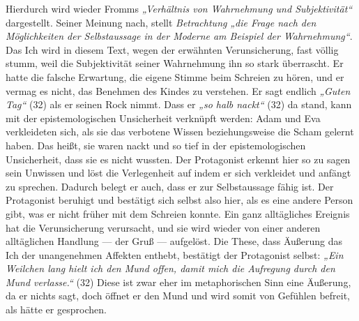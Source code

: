 \documentclass[12pt,a4paper]{article}
\begin{document}
Hierdurch wird wieder Fromms \textit{„Verhältnis von Wahrnehmung und Subjektivität“} dargestellt. Seiner Meinung nach, stellt \textit{Betrachtung} \textit{„die Frage nach den Möglichkeiten der Selbstaussage in der Moderne am Beispiel der Wahrnehmung“}.\autocite[104]{fromm} Das Ich wird in diesem Text, wegen der erwähnten Verunsicherung, fast völlig stumm, weil die Subjektivität seiner Wahrnehmung ihn so stark überrascht. Er hatte die falsche Erwartung, die eigene Stimme beim Schreien zu hören, und er vermag es nicht, das Benehmen des Kindes zu verstehen. Er sagt endlich \textit{„Guten Tag“} (32) als er seinen Rock nimmt. Dass er \textit{„so halb nackt“} (32) da stand, kann mit der epistemologischen Unsicherheit verknüpft werden: Adam und Eva verkleideten sich, als sie das verbotene Wissen beziehungsweise die Scham gelernt haben. Das heißt, sie waren nackt und so tief in der epistemologischen Unsicherheit, dass sie es nicht wussten. Der Protagonist erkennt hier so zu sagen sein Unwissen und löst die Verlegenheit auf indem er sich verkleidet und anfängt zu sprechen. Dadurch belegt er auch, dass er zur Selbstaussage fähig ist. Der Protagonist beruhigt und bestätigt sich selbst also hier, als es eine andere Person gibt, was er nicht früher mit dem Schreien konnte. Ein ganz alltägliches Ereignis hat die Verunsicherung verursacht, und sie wird wieder von einer anderen alltäglichen Handlung — der Gruß — aufgelöst. Die These, dass Äußerung das Ich der unangenehmen Affekten enthebt, bestätigt der Protagonist selbst: \textit{„Ein Weilchen lang hielt ich den Mund offen, damit mich die Aufregung durch den Mund verlasse.“} (32) Diese ist zwar eher im metaphorischen Sinn eine Äußerung, da er nichts sagt, doch öffnet er den Mund und wird somit von Gefühlen befreit, als hätte er gesprochen.\par
%
\end{document}
